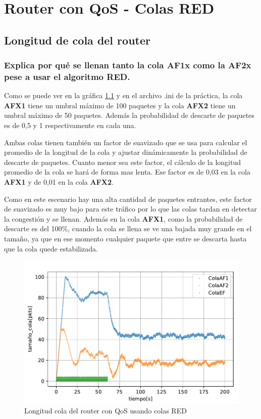 \chapter{Router con QoS - Colas RED}
\label{chap:colasRED}

\section{Longitud de cola del router}

\subsection{Explica por qué se llenan tanto la cola AF1x como la AF2x pese a usar el algoritmo RED.} \label{chap:ejercicio411}
Como se puede ver en la gráfica \ref{fig:colasRED_tam} y en el archivo .ini de la práctica, la cola \textbf{AFX1} tiene un umbral máximo de 100 paquetes y la cola
\textbf{AFX2} tiene un umbral máximo de 50 paquetes. Además la probabilidad de descarte de paquetes es de 0,5 y 1 respectivamente en cada una.

Ambas colas tienen también un factor de suavizado que se usa para calcular el promedio de la longitud de la cola y ajustar dinámicamente la probabilidad
de descarte de paquetes. Cuanto menor sea este factor, el cálculo de la longitud promedio de la cola se hará de forma mas lenta. 
Ese factor es de 0,03 en la cola \textbf{AFX1} y de 0,01 en la cola \textbf{AFX2}.

Como en este escenario hay una alta cantidad de paquetes entrantes, este factor de suavizado es muy bajo para este tráfico por lo que las colas tardan en detectar
la congestión y se llenan. Además en la cola \textbf{AFX1}, como la probabilidad de descarte es del 100\%, cuando la cola se llena se ve una
bajada muy grande en el tamaño, ya que en ese momento cualquier paquete que entre se descarta hasta que la cola quede estabilizada. 


\begin{figure}[!ht]
    \centering
    \includegraphics{graficas/RED/tamao_cola_red.pdf}
    \caption{Longitud cola del router con QoS usando colas RED}
    \label{fig:colasRED_tam}
\end{figure}


